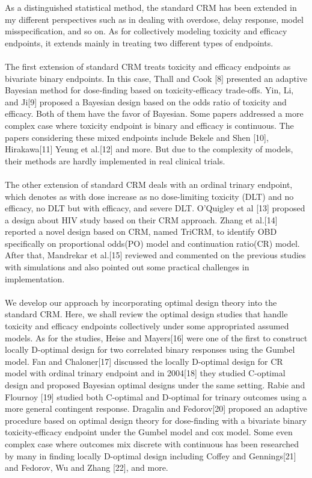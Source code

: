 \documentclass[12pt]{article}
\begin{document}
As a distinguished statistical method, the standard CRM has been extended in my different perspectives such as in dealing with overdose, delay response, model misspecification, and so on. As for collectively modeling toxicity and efficacy endpoints, it extends mainly in treating two different types of endpoints.\\
\\
The first extension of standard CRM treats toxicity and efficacy endpoints as bivariate binary endpoints. In this case, Thall and Cook [8] presented an adaptive Bayesian method for dose‐finding based on toxicity-efficacy trade‐offs. Yin, Li, and Ji[9] proposed a Bayesian design based on the odds ratio of toxicity and efficacy. Both of them have the favor of Bayesian. Some papers addressed a more complex case where toxicity endpoint is binary and efficacy is continuous. The papers considering these mixed endpoints include Bekele and Shen [10], Hirakawa[11] Yeung et al.[12] and more. But due to the complexity of models, their methods are hardly implemented in real clinical trials.\\
\\
The other extension of standard CRM deals with an ordinal trinary endpoint, which denotes as with dose increase as no dose-limiting toxicity (DLT) and no efficacy, no DLT but with efficacy, and severe DLT. O’Quigley et al [13] proposed a design about HIV study based on their CRM approach. Zhang et al.[14] reported a novel design based on CRM, named TriCRM, to identify OBD specifically on proportional odds(PO) model and continuation ratio(CR) model. After that, Mandrekar et al.[15] reviewed and commented on the previous studies with simulations and also pointed out some practical challenges in implementation.\\
\\
We develop our approach by incorporating optimal design theory into the standard CRM. Here, we shall review the optimal design studies that handle toxicity and efficacy endpoints collectively under some appropriated assumed models. As for the studies, Heise and Mayers[16] were one of the first to construct locally D-optimal design for two correlated binary responses using the Gumbel model. Fan and Chaloner[17] discussed the locally D-optimal design for CR model with ordinal trinary endpoint and in 2004[18] they studied C-optimal design and proposed Bayesian optimal designs under the same setting. Rabie and Flournoy [19] studied both C-optimal and D-optimal for trinary outcomes using a more general contingent response. Dragalin and Fedorov[20] proposed an adaptive procedure based on optimal design theory for dose-finding with a bivariate binary toxicity-efficacy endpoint under the Gumbel model and cox model. Some even complex case where outcomes mix discrete with continuous has been researched by many in finding locally D-optimal design including Coffey and Gennings[21] and Fedorov, Wu and Zhang [22], and more.\\
\end{document}
